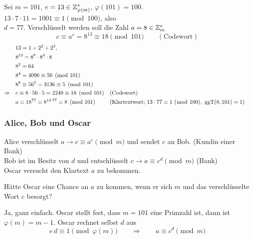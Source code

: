 \begin{beispiel}
Sei $m = 101$, $e = 13 \in \mathbb{Z}_{\varphi(m)}^*$, \quad $\varphi(101) = 100$.\\
$13 \cdot 7 \cdot 11 = 1001 \equiv 1 \pmod{100}$, also\\
$d = 77$. Verschlüsselt werden soll die Zahl $a = 8 \in \mathbb{Z}_{m}^*$
\[
  c \equiv a^e = 8^{13} \equiv 18 \pmod{101} \qquad (\text{Codewort})
\]
\begin{align*}
  & 13 = 1 + 2^2 + 2^3, \\
  & 8^{13} = 8^8 \cdot 8^4 \cdot 8 \\
  & 8^2 = 64 \\
  & 8^4 = 4096 \equiv 56 \pmod{101} \\
  & 8^8 \equiv 56^2 = 3136 \equiv 5 \pmod{101} \\
  \Rightarrow\quad & c \equiv 8 \cdot 56 \cdot 5 = 2240 \equiv 18 \pmod{101} && (\text{Codewort}) \\
  & a \equiv 18^{77} \equiv 8^{13 \cdot 77} \equiv 8 \pmod{101} && (\text{Klartextwort; } 13 \cdot 77 \equiv 1 \ (\bmod\ 100),\ \operatorname{ggT}(8, 101) = 1)
\end{align*}
\end{beispiel}

\subsubsection*{Alice, Bob und Oscar}

Alice verschlüsselt $a \to c \equiv a^e \pmod{m}$ und sendet $c$ an Bob. \hfill (Kundin einer Bank)\\
Bob ist im Besitz von $d$ und entschlüsselt $c \to a \equiv c^d \pmod{m}$ \hfill (Bank)\\
Oscar versucht den Klartext $a$ zu bekommen.

\begin{beispiel}
Hätte Oscar eine Chance an $a$ zu kommen, wenn er sich $m$ und das verschlüsselte Wort $c$ besorgt?

Ja, ganz einfach. Oscar stellt fest, dass $m = 101$ eine Primzahl ist, dann ist $\varphi(m) = m - 1$. Oscar rechnet selbst $d$ aus
\[
  e\,d \equiv 1 \pmod{\varphi(m)} \qquad \Rightarrow \qquad a \equiv c^d \pmod{m}
\]
\end{beispiel}

